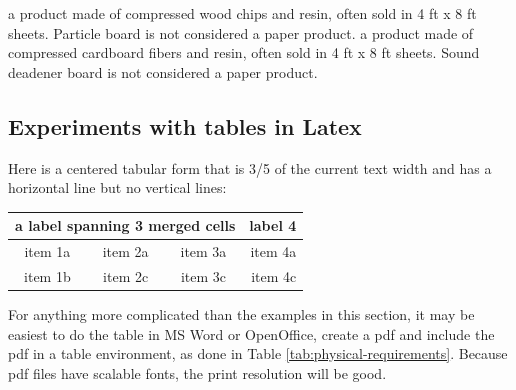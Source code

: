  {a product made of compressed wood chips and resin, often sold in 4 ft x 8 ft sheets. Particle board is not considered a paper product.}
 {a product made of compressed cardboard fibers and resin, often sold in 4 ft x 8 ft sheets. Sound deadener board is not considered a paper product.}

\begin{remark} \color{blue}
\section*{Experiments with tables in Latex}

Here is a centered tabular form that is 3/5 of the current text width and has a horizontal line but no
vertical lines:

 \begin{center}  %
  \begin{tabular*}{0.6 \textwidth}%
     {@{\extracolsep{\fill}}cccr}
  \multicolumn{3}{c}{a label spanning 3 merged cells} & label 4  \\
  \hline  %
  item 1a  & item 2a  & item 3a  & item 4a  \\
  item 1b  & item 2c  & item 3c  & item 4c  \\
  \end{tabular*}
  \end{center}

\noindent For anything more complicated than the examples in this section, it may be easiest to do the table in MS Word or OpenOffice, create a pdf and include the pdf in a table environment, as done in Table \ref{tab:physical-requirements}. Because pdf files have scalable fonts, the print resolution will be good.

\end{remark}\normalcolor
